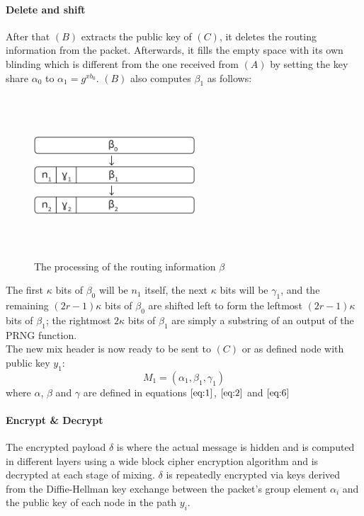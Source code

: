 \paragraph{Delete and shift}
After that $(B)$ extracts the public key of $(C)$, it deletes the routing information from the packet. Afterwards, it fills the empty space with its own blinding which is different from the one received from $(A)$ by setting the key share $\alpha_0$ to $\alpha_1=g^{xb_0}$. $(B)$ also computes $\beta_1$ as follows:
\begin{figure}[H]
    \centering
    \includegraphics[width=6cm,height=6cm,keepaspectratio]{../yellowpaper/images/FigureB.png}
    \caption{The processing of the routing information $\beta$}
    \label{fig:The processing of the routing information beta}
    \end{figure}
\hspace{-5mm}The first $\kappa$ bits of $\beta_0$ will be $n_{1}$ itself, the next $\kappa$ bits will be $\gamma_{1}$, and the remaining $(2r-1)\kappa$ bits of $\beta_0$ are shifted left to form the leftmost $(2r-1)\kappa$ bits of $\beta_{1}$; the rightmost $2\kappa$ bits of $\beta_{1}$ are simply a substring of an output of the PRNG function.
\\The new mix header is now ready to be sent to $(C)$ or as defined node with public key $y_1$:
$$M_1=(\alpha_1,\beta_1,\gamma_1)$$
where $\alpha$, $\beta$ and $\gamma$ are defined in equations $\ref{eq:1}$, $\ref{eq:2}$ and $\ref{eq:6}$
\paragraph{Encrypt \& Decrypt}
The encrypted payload $\delta$ is where the actual message is hidden and is computed in different layers using a wide block cipher encryption algorithm and is decrypted at each stage of mixing.
$\delta$ is repeatedly encrypted via keys derived from the Diffie-Hellman key exchange between the packet’s group element $\alpha_i$ and the public key of each node in the path $y_i$.

